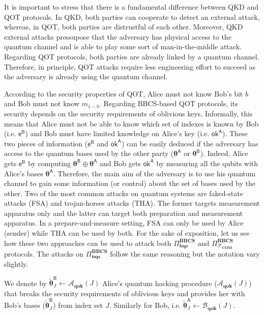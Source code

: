 It is important to stress that there is a fundamental difference between QKD and QOT protocols. In QKD, both parties can cooperate to detect an external attack, whereas, in QOT, both parties are distrustful of each other. Moreover, QKD external attacks pressupose that the adversary has physical access to the quantum channel and is able to play some sort of man-in-the-middle attack. Regarding QOT protocols, both parties are already linked by a quantum channel. Therefore, in principle, QOT attacks require less engineering effort to succeed as the adversary is already using the quantum channel.

According to the security properties of QOT, Alice must not know Bob's bit $b$ and Bob must not know $m_{1-b}$. Regarding BBCS-based QOT protocols, its security depends on the security requirements of oblivious keys. Informally, this means that Alice must not be able to know which set of indexes is known by Bob (i.e. $\mathsf{e}^\mathsf{B}$) and Bob must have limited knowledge on Alice's key (i.e. $\mathsf{ok}^\mathsf{A}$). These two pieces of information ($\mathsf{e}^\mathsf{B}$ and $\mathsf{ok}^\mathsf{A}$) can be easily deduced if the adversary has access to the quantum bases used by the other party ($\bm{\theta}^{\mathsf{A}}$ or $\bm{\theta}^{\mathsf{B}}$). Indeed, Alice gets $\mathsf{e}^\mathsf{B}$ by computing $\bm{\theta}^{\mathsf{B}} \oplus \bm{\theta}^{\mathsf{A}}$ and Bob gets $\mathsf{ok}^\mathsf{A}$ by measuring all the qubits with Alice's bases $\bm{\theta}^{\mathsf{A}}$. Therefore, the main aim of the adversary is to use his quantum channel to gain some information (or control) about the set of bases used by the other. Two of the most common attacks on quantum systems are faked-state attacks \cite{MH05} (FSA) and trojan-horses attacks \cite{GFKZR06} (THA). The former targets measurement apparatus only and the latter can target both preparation and measurement apparatus. In a prepare-and-measure setting, FSA can only be used by Alice (sender) while THA can be used by both. For the sake of exposition, let us see how these two approaches can be used to attack both $\Pi^{\textbf{BBCS}}_{\textbf{bqs}}$ and $\Pi^{\textbf{BBCS}}_{\mathcal{F}_\textbf{COM}}$ protocols. The attacks on $\Pi^{\textbf{BBCS}}_{\textbf{nqs}}$ follow the same reasoning but the notation vary slightly. 

We denote by $\tilde{\bm{\theta}}^{\mathsf{B}}_J \leftarrow \mathcal{A}_{\textbf{qok}}(J)$ Alice's quantum hacking procedure ($\mathcal{A}_{\textbf{qok}}(J)$) that breaks the security requirements of oblivious keys and provides her with Bob's bases ($\tilde{\bm{\theta}}^{\mathsf{B}}_J$) from index set $J$. Similarly for Bob, i.e. $\tilde{\bm{\theta}}^{\mathsf{A}}_J \leftarrow \mathcal{B}_{\textbf{qok}}(J)$.

